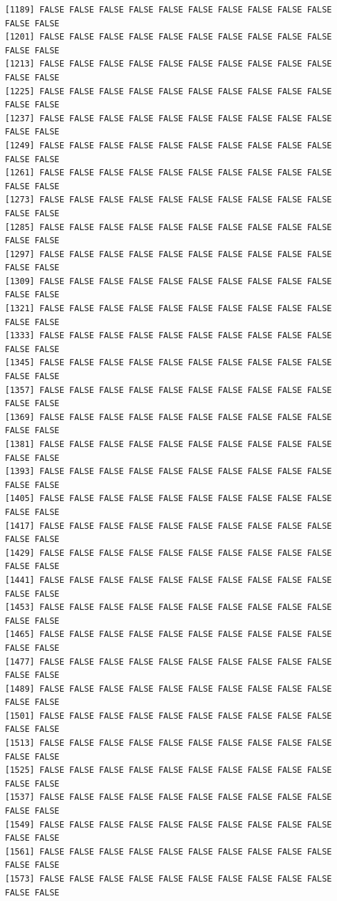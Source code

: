 \documentclass[
  letterpaper,
  DIV=11,
  numbers=noendperiod]{scrreprt}
\begin{document}
\begin{verbatim}
[1189] FALSE FALSE FALSE FALSE FALSE FALSE FALSE FALSE FALSE FALSE FALSE FALSE
[1201] FALSE FALSE FALSE FALSE FALSE FALSE FALSE FALSE FALSE FALSE FALSE FALSE
[1213] FALSE FALSE FALSE FALSE FALSE FALSE FALSE FALSE FALSE FALSE FALSE FALSE
[1225] FALSE FALSE FALSE FALSE FALSE FALSE FALSE FALSE FALSE FALSE FALSE FALSE
[1237] FALSE FALSE FALSE FALSE FALSE FALSE FALSE FALSE FALSE FALSE FALSE FALSE
[1249] FALSE FALSE FALSE FALSE FALSE FALSE FALSE FALSE FALSE FALSE FALSE FALSE
[1261] FALSE FALSE FALSE FALSE FALSE FALSE FALSE FALSE FALSE FALSE FALSE FALSE
[1273] FALSE FALSE FALSE FALSE FALSE FALSE FALSE FALSE FALSE FALSE FALSE FALSE
[1285] FALSE FALSE FALSE FALSE FALSE FALSE FALSE FALSE FALSE FALSE FALSE FALSE
[1297] FALSE FALSE FALSE FALSE FALSE FALSE FALSE FALSE FALSE FALSE FALSE FALSE
[1309] FALSE FALSE FALSE FALSE FALSE FALSE FALSE FALSE FALSE FALSE FALSE FALSE
[1321] FALSE FALSE FALSE FALSE FALSE FALSE FALSE FALSE FALSE FALSE FALSE FALSE
[1333] FALSE FALSE FALSE FALSE FALSE FALSE FALSE FALSE FALSE FALSE FALSE FALSE
[1345] FALSE FALSE FALSE FALSE FALSE FALSE FALSE FALSE FALSE FALSE FALSE FALSE
[1357] FALSE FALSE FALSE FALSE FALSE FALSE FALSE FALSE FALSE FALSE FALSE FALSE
[1369] FALSE FALSE FALSE FALSE FALSE FALSE FALSE FALSE FALSE FALSE FALSE FALSE
[1381] FALSE FALSE FALSE FALSE FALSE FALSE FALSE FALSE FALSE FALSE FALSE FALSE
[1393] FALSE FALSE FALSE FALSE FALSE FALSE FALSE FALSE FALSE FALSE FALSE FALSE
[1405] FALSE FALSE FALSE FALSE FALSE FALSE FALSE FALSE FALSE FALSE FALSE FALSE
[1417] FALSE FALSE FALSE FALSE FALSE FALSE FALSE FALSE FALSE FALSE FALSE FALSE
[1429] FALSE FALSE FALSE FALSE FALSE FALSE FALSE FALSE FALSE FALSE FALSE FALSE
[1441] FALSE FALSE FALSE FALSE FALSE FALSE FALSE FALSE FALSE FALSE FALSE FALSE
[1453] FALSE FALSE FALSE FALSE FALSE FALSE FALSE FALSE FALSE FALSE FALSE FALSE
[1465] FALSE FALSE FALSE FALSE FALSE FALSE FALSE FALSE FALSE FALSE FALSE FALSE
[1477] FALSE FALSE FALSE FALSE FALSE FALSE FALSE FALSE FALSE FALSE FALSE FALSE
[1489] FALSE FALSE FALSE FALSE FALSE FALSE FALSE FALSE FALSE FALSE FALSE FALSE
[1501] FALSE FALSE FALSE FALSE FALSE FALSE FALSE FALSE FALSE FALSE FALSE FALSE
[1513] FALSE FALSE FALSE FALSE FALSE FALSE FALSE FALSE FALSE FALSE FALSE FALSE
[1525] FALSE FALSE FALSE FALSE FALSE FALSE FALSE FALSE FALSE FALSE FALSE FALSE
[1537] FALSE FALSE FALSE FALSE FALSE FALSE FALSE FALSE FALSE FALSE FALSE FALSE
[1549] FALSE FALSE FALSE FALSE FALSE FALSE FALSE FALSE FALSE FALSE FALSE FALSE
[1561] FALSE FALSE FALSE FALSE FALSE FALSE FALSE FALSE FALSE FALSE FALSE FALSE
[1573] FALSE FALSE FALSE FALSE FALSE FALSE FALSE FALSE FALSE FALSE FALSE FALSE

\end{verbatim}
\end{document}
